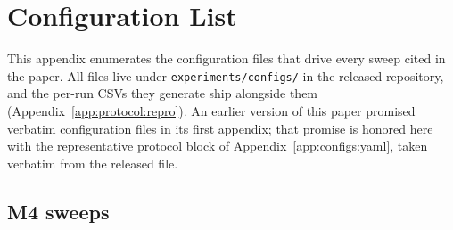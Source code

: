 %
%
%

\section{Configuration List}
\label{app:configs}

This appendix enumerates the configuration files that drive every sweep
cited in the paper. All files live under \texttt{experiments/configs/} in
the released repository, and the per-run CSVs they generate ship alongside
them (Appendix~\ref{app:protocol:repro}). An earlier version of this paper
promised verbatim configuration files in its first appendix; that promise
is honored here with the representative protocol block of
Appendix~\ref{app:configs:yaml}, taken verbatim from the released file.

\subsection{M4 sweeps}
\label{app:configs:m4}

